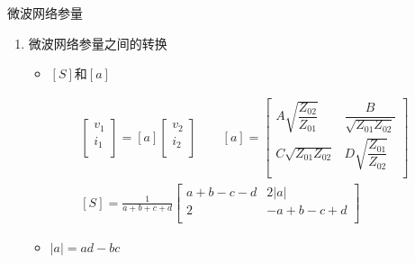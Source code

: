 \begin{frame}{微波网络参量}
    \begin{enumerate}
        \resume
        \item 微波网络参量之间的转换
              \begin{itemize}
                  \item $[S]$和$[a]$
              \end{itemize}
              \begin{align*}
                  \begin{bmatrix*}
                      v_1 \\
                      i_1 \\
                  \end{bmatrix*}
                  =[a]
                  \begin{bmatrix*}
                      v_2 \\
                      i_2 \\
                  \end{bmatrix*}
                  \qquad
                  [a]=
                  \begin{bmatrix*}
                      A\sqrt{\dfrac{Z_{02}}{Z_{01}}} & \dfrac{B}{\sqrt{Z_{01}Z_{02}}}  \\
                      C\sqrt{Z_{01}Z_{02}} & D\sqrt{\dfrac{Z_{01}}{Z_{02}}} \\
                  \end{bmatrix*} \\
                  [S]=\frac{1}{a+b+c+d}
                  \begin{bmatrix*}
                      a+b-c-d & 2|{a}| \\
                      2 & -a+b-c+d \\
                  \end{bmatrix*}
              \end{align*}
              \begin{itemize}
                  \item $|a| = ad-bc$
              \end{itemize}
    \end{enumerate}
\end{frame}


